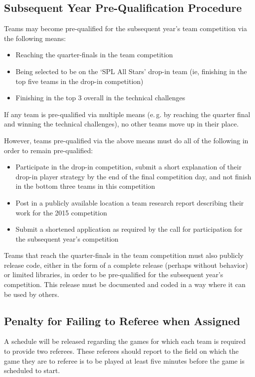 \documentclass[12pt]{article}
\newcommand{\eg}{\mbox{e.\,g.}\xspace}
\begin{document}
\subsection{Subsequent Year Pre-Qualification Procedure}
\label{sec:preQual}
Teams may become pre-qualified for the subsequent year's team competition via the following means:
\begin{itemize}
\item Reaching the quarter-finals in the team competition
\item Being selected to be on the `SPL All Stars' drop-in team (ie, finishing in the top five teams in the drop-in competition)
\item Finishing in the top 3 overall in the technical challenges
\end{itemize}
If any team is pre-qualified via multiple means (\eg by reaching the quarter final and winning the technical challenges), no other teams move up in their place.

However, teams pre-qualified via the above means must do all of the following in order to remain pre-qualified:
\begin{itemize}
\item Participate in the drop-in competition, submit a short explanation of their drop-in player strategy by the end of the final competition day, and not finish in the bottom three teams in this competition
\item Post in a publicly available location a team research report describing their work for the 2015 competition
\item Submit a shortened application as required by the call for participation for the subsequent year's competition
\end{itemize}

Teams that reach the quarter-finals in the team competition must also publicly release code, either in the form of a complete release (perhaps without behavior) or limited libraries, in order to be pre-qualified for the subsequent year's competition.  This release must be documented and coded in a way where it can be used by others.

\subsection{Penalty for Failing to Referee when Assigned}
\label{sec:refPenalty}
A schedule will be released regarding the games for which each team is required to provide two referees.  These referees should report to the field on which the game they are to referee is to be played at least five minutes before the game is scheduled to start.
\end{document}
